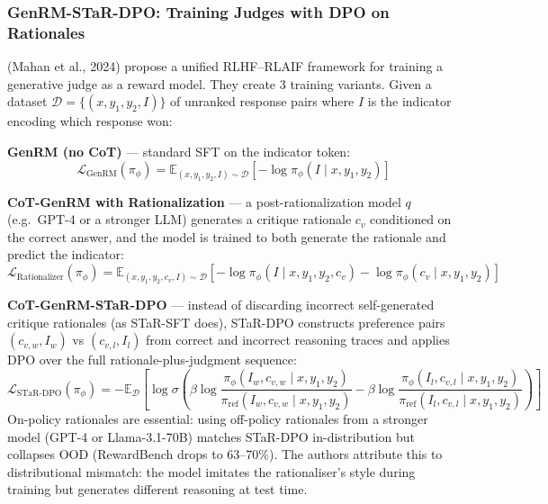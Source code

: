 \documentclass[11pt]{article}
\begin{document}
\subsubsection{GenRM-STaR-DPO: Training Judges with DPO on Rationales}
\label{sec:genrm-star}

\autocite{mahan2024generativerewardmodels} (Mahan et al., 2024) propose a unified RLHF--RLAIF framework for training a generative judge as a reward model. They create 3 training variants. Given a dataset $\mathcal{D} = \{(x, y_1, y_2, I)\}$ of unranked response pairs where $I$ is the indicator encoding which response won:

\textbf{GenRM (no CoT)} --- standard SFT on the indicator token:
\begin{equation}
    \mathcal{L}_{\text{GenRM}}(\pi_\phi) = \mathbb{E}_{(x,y_1,y_2,I)\sim\mathcal{D}}\!\left[-\log \pi_\phi(I \mid x, y_1, y_2)\right]
    \label{eq:genrm_nochain}
\end{equation}

\textbf{CoT-GenRM with Rationalization} --- a post-rationalization model $q$ (e.g.\ GPT-4 or a stronger LLM) generates a critique rationale $c_v$ conditioned on the correct answer, and the model is trained to both generate the rationale and predict the indicator:
\begin{equation}
    \mathcal{L}_{\text{Rationalizer}}(\pi_\phi) = \mathbb{E}_{(x,y_1,y_2,c_v,I)\sim\mathcal{D}}\!\left[-\log \pi_\phi(I \mid x, y_1, y_2, c_v) - \log \pi_\phi(c_v \mid x, y_1, y_2)\right]
    \label{eq:genrm_rat}
\end{equation}

\textbf{CoT-GenRM-STaR-DPO} --- instead of discarding incorrect self-generated critique rationales (as STaR-SFT does), STaR-DPO constructs preference pairs $(c_{v,w}, I_w)$ vs $(c_{v,l}, I_l)$ from correct and incorrect reasoning traces and applies DPO over the full rationale-plus-judgment sequence:
\begin{equation}
    \mathcal{L}_{\text{STaR-DPO}}(\pi_\phi) = -\mathbb{E}_{\mathcal{D}}\!\left[\log\sigma\!\left(\beta\log\frac{\pi_\phi(I_w, c_{v,w} \mid x, y_1, y_2)}{\pi_{\text{ref}}(I_w, c_{v,w} \mid x, y_1, y_2)} - \beta\log\frac{\pi_\phi(I_l, c_{v,l} \mid x, y_1, y_2)}{\pi_{\text{ref}}(I_l, c_{v,l} \mid x, y_1, y_2)}\right)\right]
    \label{eq:genrm_dpo}
\end{equation}
On-policy rationales are essential: using off-policy rationales from a stronger model (GPT-4 or Llama-3.1-70B) matches STaR-DPO in-distribution but collapses OOD (RewardBench drops to 63--70\%). The authors attribute this to distributional mismatch: the model imitates the rationaliser's style during training but generates different reasoning at test time.
\end{document}
